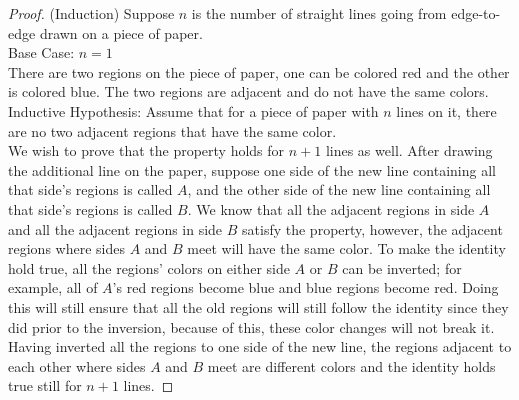 \documentclass[11pt]{article}
\begin{document}
\begin{proof}
	(Induction) Suppose $n$ is the number of straight lines going from edge-to-edge drawn on a piece of paper.\\
	Base Case: $n=1$\\
	There are two regions on the piece of paper, one can be colored red and the other is colored blue. The two regions are adjacent and do not have the same colors.\\
	Inductive Hypothesis: Assume that for a piece of paper with $n$ lines on it, there are no two adjacent regions that have the same color.\\
	We wish to prove that the property holds for $n+1$ lines as well. After drawing the additional line on the paper, suppose one side of the new line containing all that side's regions is called $A$, and the other side of the new line containing all that side's regions is called $B$. We know that all the adjacent regions in side $A$ and all the adjacent regions in side $B$ satisfy the property, however, the adjacent regions where sides $A$ and $B$ meet will have the same color. To make the identity hold true, all the regions' colors on either side $A$ or $B$ can be inverted; for example, all of $A$'s red regions become blue and blue regions become red. Doing this will still ensure that all the old regions will still follow the identity since they did prior to the inversion, because of this, these color changes will not break it. \\



	
	Having inverted all the regions to one side of the new line, the regions adjacent to each other where sides $A$ and $B$ meet are different colors and the identity holds true still for $n+1$ lines.
\end{proof}











	
\end{document}
